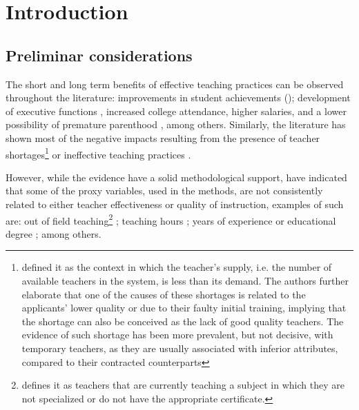 \chapter{Introduction}

\section{Preliminar considerations}

The short and long term benefits of effective teaching practices can be observed throughout the literature: improvements in student achievements (\citealp{Rockoff_2004, Rivkin_et_al_2005, Duflo_et_al_2009, Hanushek_et_al_2012, Muralidharan_et_al_2013, Chetty_et_al_2014a, Araujo_et_al_2016}); development of executive functions \citep{Araujo_et_al_2016}, increased college attendance, higher salaries, and a lower possibility of premature parenthood \citep{Chetty_et_al_2014b}, among others. Similarly, the literature has shown most of the negative impacts resulting from the presence of teacher shortages\footnote{\citet{Bertoni_et_al_2020a} defined it as the context in which the teacher's supply, i.e. the number of available teachers in the system, is less than its demand. The authors further elaborate that one of the causes of these shortages is related to the applicants' lower quality or due to their faulty initial training, implying that the shortage can also be conceived as the lack of good quality teachers. The evidence of such shortage has been more prevalent, but not decisive, with temporary teachers, as they are usually associated with inferior attributes, compared to their contracted counterparts} \citep{Duflo_et_al_2009, Muralidharan_et_al_2013, Duflo_et_al_2015, Ayala_2017, Marotta_2019} or ineffective teaching practices \citep{Hanushek_et_al_2012}.

However, while the evidence have a solid methodological support, \citet{Hanushek_et_al_2006} have indicated that some of the proxy variables, used in the methods, are not consistently related to either teacher effectiveness or quality of instruction, examples of such are: out of field teaching\footnote{\citet{Medeiros_et_al_2018} defines it as teachers that are currently teaching a subject in which they are not specialized or do not have the appropriate certificate.} \citep{Ingersoll_1998, Dee_et_al_2008, Bertoni_et_al_2020a}; teaching hours \citep{Bruns_et_al_2015}; years of experience or educational degree \citep{Rockoff_2004, Rivkin_et_al_2005, Clotfelter_et_al_2006, Clotfelter_et_al_2007, Hanushek_et_al_2012}; among others.

